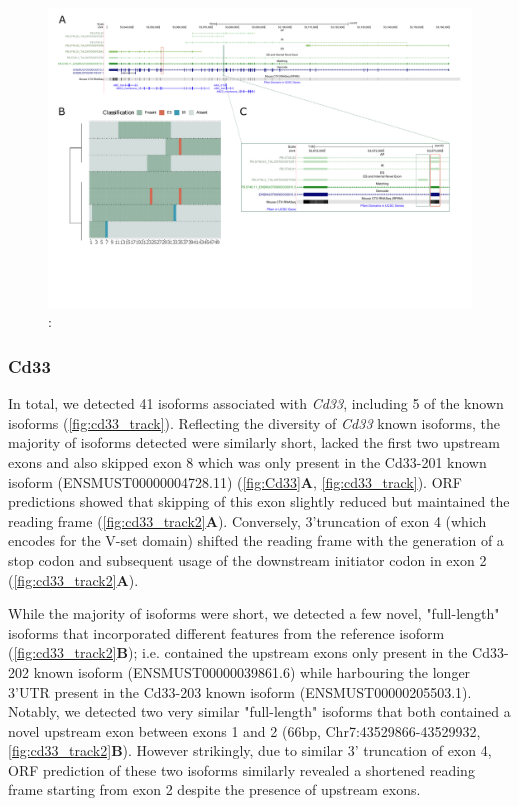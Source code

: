\begin{landscape}
	\begin{figure}[htp]
		\begin{center}
			\includegraphics[page=3,trim={0 1cm 0 0},scale = 0.85]{Figures/TargetGenes_Annotation_Landscape.pdf}
		\end{center}
		\captionsetup{width=0.95\textwidth}
		\caption[RNA-Seq defined transcriptome]%
		{\textbf{}: }   
		\label{fig:ank1}
	\end{figure}
\end{landscape}     

\newpage
\subsubsection{Cd33}
In total, we detected 41 isoforms associated with \textit{Cd33}, including 5 of the known isoforms (\cref{fig:cd33_track}). Reflecting the diversity of \textit{Cd33} known isoforms, the majority of isoforms detected were similarly short, lacked the first two upstream exons and also skipped exon 8 which was only present in the Cd33-201 known isoform (ENSMUST00000004728.11) (\cref{fig:Cd33}\textbf{A}, \cref{fig:cd33_track}). ORF predictions showed that skipping of this exon slightly reduced but maintained the reading frame (\cref{fig:cd33_track2}\textbf{A}). Conversely, 3'truncation of exon 4 (which encodes for the V-set domain) shifted the reading frame with the generation of a stop codon and subsequent usage of the downstream initiator codon in exon 2 (\cref{fig:cd33_track2}\textbf{A}).   

While the majority of isoforms were short, we detected a few novel, "full-length" isoforms that incorporated different features from the reference isoform (\cref{fig:cd33_track2}\textbf{B}); i.e. contained the upstream exons only present in the Cd33-202 known isoform (ENSMUST00000039861.6) while harbouring the longer 3'UTR present in the Cd33-203 known isoform (ENSMUST00000205503.1). Notably, we detected two very similar "full-length" isoforms that both contained a novel upstream exon between exons 1 and 2 (66bp, Chr7:43529866-43529932, \cref{fig:cd33_track2}\textbf{B}). However strikingly, due to similar 3' truncation of exon 4, ORF prediction of these two isoforms similarly revealed a shortened reading frame starting from exon 2 despite the presence of upstream exons.  


